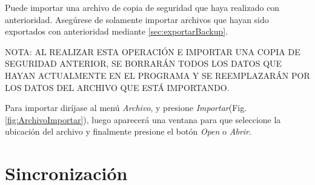 Puede importar una archivo de copia de seguridad que haya realizado con anterioridad. Aseg\'urese de solamente importar archivos que hayan sido exportados con anterioridad mediante \ref{sec:exportarBackup}.

NOTA: AL REALIZAR ESTA OPERACI\'ON E IMPORTAR UNA COPIA DE SEGURIDAD ANTERIOR, SE BORRAR\'AN TODOS LOS DATOS QUE HAYAN ACTUALMENTE EN EL PROGRAMA Y SE REEMPLAZAR\'AN POR LOS DATOS DEL ARCHIVO QUE EST\'A IMPORTANDO.

Para importar dir\'ijase al men\'u \emph{Archivo}, y presione \emph{Importar}(Fig.\ref{fig:ArchivoImportar}), luego aparecer\'a una ventana para que seleccione la ubicaci\'on del archivo y finalmente presione el bot\'on \emph{Open} o \emph{Abrir}.


\section{Sincronizaci\'on}